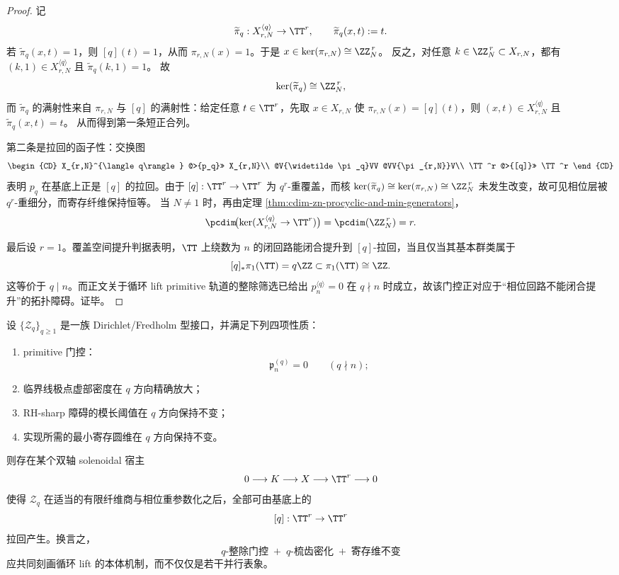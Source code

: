 \begin{proof}
记
\[
\widetilde\pi_q:X_{r,N}^{\langle q\rangle}\to \TT^r,\qquad \widetilde\pi_q(x,t):=t.
\]
若 \(\widetilde\pi_q(x,t)=1\)，则 \([q](t)=1\)，从而 \(\pi_{r,N}(x)=1\)。于是 \(x\in\ker(\pi_{r,N})\cong \ZZ_N^{\,r}\)。
反之，对任意 \(k\in\ZZ_N^{\,r}\subset X_{r,N}\)，都有 \((k,1)\in X_{r,N}^{\langle q\rangle}\) 且 \(\widetilde\pi_q(k,1)=1\)。
故
\[
\ker(\widetilde\pi_q)\cong \ZZ_N^{\,r},
\]
而 \(\widetilde\pi_q\) 的满射性来自 \(\pi_{r,N}\) 与 \([q]\) 的满射性：给定任意 \(t\in\TT^r\)，先取 \(x\in X_{r,N}\) 使 \(\pi_{r,N}(x)=[q](t)\)，则 \((x,t)\in X_{r,N}^{\langle q\rangle}\) 且 \(\widetilde\pi_q(x,t)=t\)。
从而得到第一条短正合列。

第二条是拉回的函子性：交换图
\[
\begin{CD}
X_{r,N}^{\langle q\rangle} @>{p_q}>> X_{r,N}\\
@V{\widetilde\pi_q}VV @VV{\pi_{r,N}}V\\
\TT^r @>{[q]}>> \TT^r
\end{CD}
\]
表明 \(p_q\) 在基底上正是 \([q]\) 的拉回。由于 \([q]:\TT^r\to\TT^r\) 为 \(q^r\)-重覆盖，而核
\(
\ker(\widetilde\pi_q)\cong\ker(\pi_{r,N})\cong \ZZ_N^{\,r}
\)
未发生改变，故可见相位层被 \(q^r\)-重细分，而寄存纤维保持恒等。
当 \(N\neq 1\) 时，再由定理 \ref{thm:cdim-zn-procyclic-and-min-generators}，
\[
\pcdim\!\bigl(\ker(X_{r,N}^{\langle q\rangle}\to \TT^r)\bigr)
=
\pcdim(\ZZ_N^{\,r})=r.
\]

最后设 \(r=1\)。覆盖空间提升判据表明，\(\TT\) 上绕数为 \(n\) 的闭回路能闭合提升到 \([q]\)-拉回，当且仅当其基本群类属于
\[
[q]_\ast\pi_1(\TT)=q\ZZ\subset \pi_1(\TT)\cong \ZZ.
\]
这等价于 \(q\mid n\)。而正文关于循环 lift primitive 轨道的整除筛选已给出
\(
p_n^{\langle q\rangle}=0
\)
在 \(q\nmid n\) 时成立，故该门控正对应于“相位回路不能闭合提升”的拓扑障碍。证毕。
\end{proof}

\begin{conjecture}[相位拉回的普适刻画性]\label{conj:conclusion-phase-q-pullback-universality}
设 \(\{\mathcal Z_q\}_{q\ge 1}\) 是一族 Dirichlet/Fredholm 型接口，并满足下列四项性质：
\begin{enumerate}
  \item primitive 门控：
  \[
  \mathfrak p_n^{(q)}=0\qquad (q\nmid n);
  \]
  \item 临界线极点虚部密度在 \(q\) 方向精确放大；
  \item RH-sharp 障碍的模长阈值在 \(q\) 方向保持不变；
  \item 实现所需的最小寄存圆维在 \(q\) 方向保持不变。
\end{enumerate}
则存在某个双轴 solenoidal 宿主
\[
0\longrightarrow K\longrightarrow X\longrightarrow \TT^r\longrightarrow 0
\]
使得 \(\mathcal Z_q\) 在适当的有限纤维商与相位重参数化之后，全部可由基底上的
\[
[q]:\TT^r\to\TT^r
\]
拉回产生。换言之，
\[
\text{\(q\)-整除门控}
\;+\;
\text{\(q\)-梳齿密化}
\;+\;
\text{寄存维不变}
\]
应共同刻画循环 lift 的本体机制，而不仅仅是若干并行表象。
\end{conjecture}

